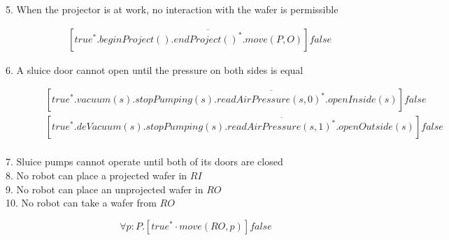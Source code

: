 \begin{description}
 
 \item[5. When the projector is at work, no interaction with the wafer is permissible]
 	\begin{align*}
 		&[true^*.beginProject().\overline{endProject()^*}.move(P,O)]false
	\end{align*}
	
 \item[6. A sluice door cannot open until the pressure on both sides is equal]
	\begin{align*}
		&[true^*.vacuum(s).stopPumping(s).\overline{readAirPressure(s,0)^*}.openInside(s)]false \\
		&[true^*.deVacuum(s).stopPumping(s).\overline{readAirPressure(s,1)^*}.openOutside(s)]false \\
	\end{align*}
	
 \item[7. Sluice pumps cannot operate until both of its doors are closed]

 \item[8. No robot can place a projected wafer in $RI$]

 \item[9. No robot can place an unprojected wafer in $RO$]

 \item[10. No robot can take a wafer from $RO$]

\[
	\forall p:P . [true^* \cdot move(RO, p)]false
\]

\end{description}
